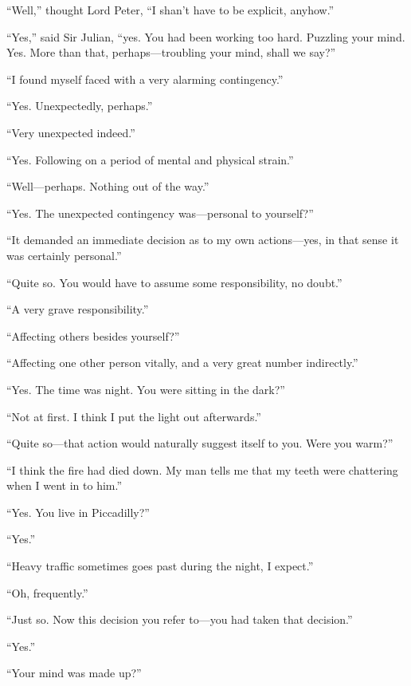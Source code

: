 \enquote{Well,} thought Lord Peter, \enquote{I shan’t have to be explicit, anyhow.}

\enquote{Yes,} said Sir Julian, \enquote{yes. You had been working too hard. Puzzling your mind. Yes. More than that, perhaps\allowbreak---\allowbreak troubling your mind, shall we say?}

\enquote{I found myself faced with a very alarming contingency.}

\enquote{Yes. Unexpectedly, perhaps.}

\enquote{Very unexpected indeed.}

\enquote{Yes. Following on a period of mental and physical strain.}

\enquote{Well\allowbreak---\allowbreak perhaps. Nothing out of the way.}

\enquote{Yes. The unexpected contingency was\allowbreak---\allowbreak personal to yourself?}

\enquote{It demanded an immediate decision as to my own actions\allowbreak---\allowbreak yes, in that sense it was certainly personal.}

\enquote{Quite so. You would have to assume some responsibility, no doubt.}

\enquote{A very grave responsibility.}

\enquote{Affecting others besides yourself?}

\enquote{Affecting one other person vitally, and a very great number indirectly.}

\enquote{Yes. The time was night. You were sitting in the dark?}

\enquote{Not at first. I think I put the light out afterwards.}

\enquote{Quite so\allowbreak---\allowbreak that action would naturally suggest itself to you. Were you warm?}

\enquote{I think the fire had died down. My man tells me that my teeth were chattering when I went in to him.}

\enquote{Yes. You live in Piccadilly?}

\enquote{Yes.}

\enquote{Heavy traffic sometimes goes past during the night, I expect.}

\enquote{Oh, frequently.}

\enquote{Just so. Now this decision you refer to\allowbreak---\allowbreak you had taken that decision.}

\enquote{Yes.}

\enquote{Your mind was made up?}

